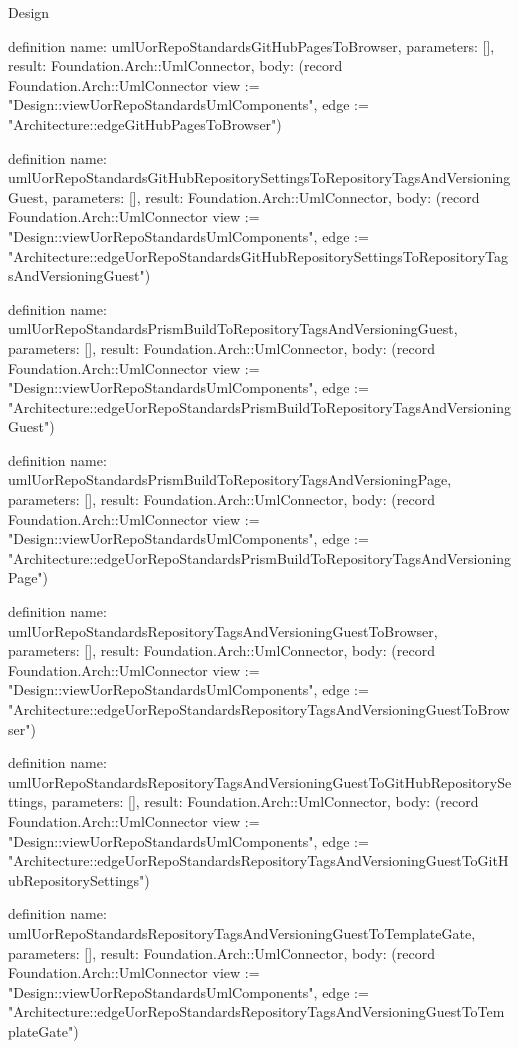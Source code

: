 \begin{lexlean}{Design}
\begin{semanticmodule}
definition{
  name: umlUorRepoStandardsGitHubPagesToBrowser,
  parameters: [],
  result: Foundation.Arch::UmlConnector,
  body: (record Foundation.Arch::UmlConnector {view := "Design::viewUorRepoStandardsUmlComponents", edge := "Architecture::edgeGitHubPagesToBrowser"})
}

definition{
  name: umlUorRepoStandardsGitHubRepositorySettingsToRepositoryTagsAndVersioningGuest,
  parameters: [],
  result: Foundation.Arch::UmlConnector,
  body: (record Foundation.Arch::UmlConnector {view := "Design::viewUorRepoStandardsUmlComponents", edge := "Architecture::edgeUorRepoStandardsGitHubRepositorySettingsToRepositoryTagsAndVersioningGuest"})
}

definition{
  name: umlUorRepoStandardsPrismBuildToRepositoryTagsAndVersioningGuest,
  parameters: [],
  result: Foundation.Arch::UmlConnector,
  body: (record Foundation.Arch::UmlConnector {view := "Design::viewUorRepoStandardsUmlComponents", edge := "Architecture::edgeUorRepoStandardsPrismBuildToRepositoryTagsAndVersioningGuest"})
}

definition{
  name: umlUorRepoStandardsPrismBuildToRepositoryTagsAndVersioningPage,
  parameters: [],
  result: Foundation.Arch::UmlConnector,
  body: (record Foundation.Arch::UmlConnector {view := "Design::viewUorRepoStandardsUmlComponents", edge := "Architecture::edgeUorRepoStandardsPrismBuildToRepositoryTagsAndVersioningPage"})
}

definition{
  name: umlUorRepoStandardsRepositoryTagsAndVersioningGuestToBrowser,
  parameters: [],
  result: Foundation.Arch::UmlConnector,
  body: (record Foundation.Arch::UmlConnector {view := "Design::viewUorRepoStandardsUmlComponents", edge := "Architecture::edgeUorRepoStandardsRepositoryTagsAndVersioningGuestToBrowser"})
}

definition{
  name: umlUorRepoStandardsRepositoryTagsAndVersioningGuestToGitHubRepositorySettings,
  parameters: [],
  result: Foundation.Arch::UmlConnector,
  body: (record Foundation.Arch::UmlConnector {view := "Design::viewUorRepoStandardsUmlComponents", edge := "Architecture::edgeUorRepoStandardsRepositoryTagsAndVersioningGuestToGitHubRepositorySettings"})
}

definition{
  name: umlUorRepoStandardsRepositoryTagsAndVersioningGuestToTemplateGate,
  parameters: [],
  result: Foundation.Arch::UmlConnector,
  body: (record Foundation.Arch::UmlConnector {view := "Design::viewUorRepoStandardsUmlComponents", edge := "Architecture::edgeUorRepoStandardsRepositoryTagsAndVersioningGuestToTemplateGate"})
}


\end{semanticmodule}
\end{lexlean}
